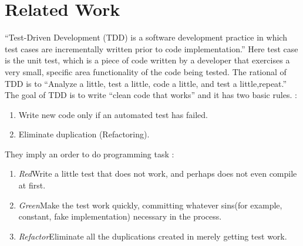 
\chapter{Related Work}

``Test-Driven Development (TDD) is a software development practice in which
test cases are incrementally written prior to code
implementation.''\cite{George_2003} Here test case is the unit test, which
is a piece of code written by a developer that exercises a very small,
specific area functionality of the code being tested. The rational of TDD
is to ``Analyze a little, test a little, code a little, and test a
little,repeat.'' The goal of TDD is to write ``clean code that
works''\cite{Beck_TDD_2003} and it has two basic rules. \cite{Beck_TDD_2003}:

\begin{enumerate}
\item Write new code only if an automated test has failed.
\item Eliminate duplication (Refactoring).
\end{enumerate}

\begin{description}
\item They imply an order to do programming task \cite{Beck_TDD_2003}:
\begin{enumerate}
\item \emph{Red}\newline Write a little test that does not work, and perhaps
does not even compile at first.
\item \emph{Green}\newline Make the test work quickly, committing whatever
sins(for example, constant, fake implementation) necessary in the process.
\item \emph{Refactor}\newline Eliminate all the duplications created in
merely getting test work.
\end{enumerate}
\end{description}

